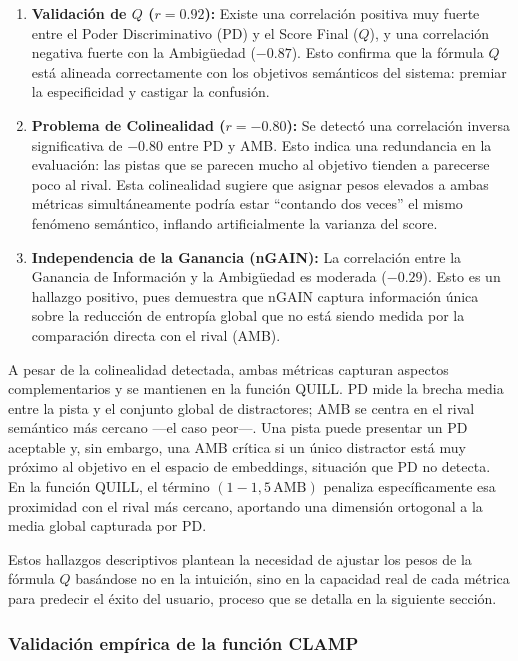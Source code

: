 \documentclass[../main.tex]{subfiles}
\begin{document}
\begin{enumerate}
    \item \textbf{Validación de $Q$ ($r=0.92$):} Existe una correlación positiva muy fuerte entre el Poder Discriminativo (PD) y el Score Final ($Q$), y una correlación negativa fuerte con la Ambigüedad ($-0.87$). Esto confirma que la fórmula $Q$ está alineada correctamente con los objetivos semánticos del sistema: premiar la especificidad y castigar la confusión.
    
    \item \textbf{Problema de Colinealidad ($r=-0.80$):} Se detectó una correlación inversa significativa de $-0.80$ entre PD y AMB. Esto indica una redundancia en la evaluación: las pistas que se parecen mucho al objetivo tienden a parecerse poco al rival. Esta colinealidad sugiere que asignar pesos elevados a ambas métricas simultáneamente podría estar ``contando dos veces'' el mismo fenómeno semántico, inflando artificialmente la varianza del score.
    
    \item \textbf{Independencia de la Ganancia (nGAIN):} La correlación entre la Ganancia de Información y la Ambigüedad es moderada ($-0.29$). Esto es un hallazgo positivo, pues demuestra que nGAIN captura información única sobre la reducción de entropía global que no está siendo medida por la comparación directa con el rival (AMB).

\end{enumerate}

A pesar de la colinealidad detectada, ambas métricas capturan aspectos complementarios y se mantienen en la función QUILL. PD mide la brecha media entre la pista y el conjunto global de distractores; AMB se centra en el rival semántico más cercano —el caso peor—. Una pista puede presentar un PD aceptable y, sin embargo, una AMB crítica si un único distractor está muy próximo al objetivo en el espacio de embeddings, situación que PD no detecta. En la función QUILL, el término $(1 - 1{,}5\,\text{AMB})$ penaliza específicamente esa proximidad con el rival más cercano, aportando una dimensión ortogonal a la media global capturada por PD.

Estos hallazgos descriptivos plantean la necesidad de ajustar los pesos de la fórmula $Q$ basándose no en la intuición, sino en la capacidad real de cada métrica para predecir el éxito del usuario, proceso que se detalla en la siguiente sección.

\subsubsection{Validación empírica de la función CLAMP}
\end{document}

